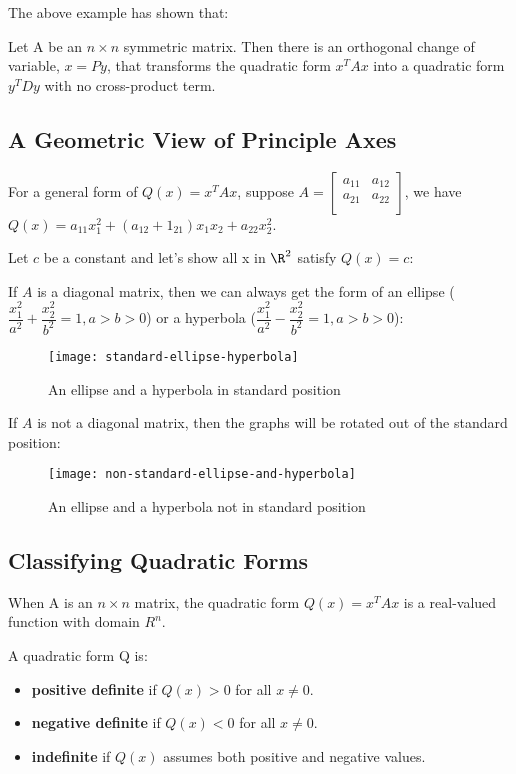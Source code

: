 The above example has shown that:
\begin{theorem}\label{theorem: Principle Axes Theorem}
    Let A be an \(n \times n\) symmetric matrix. Then there is an orthogonal change of variable, \(x = Py\), that transforms the quadratic form \(x^TAx\) into a quadratic form \(y^TDy\) with no cross-product term.    
\end{theorem}

\subsection{A Geometric View of Principle Axes}
For a general form of \(Q(x) = x^TAx\), suppose \(A = \begin{bmatrix}
    a_{11} &  a_{12} \\
    a_{21} &  a_{22} \\
\end{bmatrix}\), we have \(Q(x) = a_{11} x_1^2 + (a_{12}+1_{21})x_1x_2 + a_{22}x_2^2\).  

Let \(c\) be a constant and let's show all x in \(\R^2\) satisfy \(Q(x) = c\):  

If \(A\) is a diagonal matrix, then we can always get the form of an ellipse (\(\dfrac{x_1^2}{a^2} + \dfrac{x_2^2}{b^2} = 1, a > b > 0\)) or a hyperbola (\(\dfrac{x_1^2}{a^2} - \dfrac{x_2^2}{b^2} = 1, a > b > 0\)):
\begin{figure}[h]
    \centering
    \texttt{[image: standard-ellipse-hyperbola]}
    \caption{An ellipse and a hyperbola in standard position}
    \label{fig:standard-ellipse-hyperbola}
\end{figure}

If \(A\)  is not a diagonal matrix, then the graphs will be rotated out of the standard position:
\begin{figure}[h]
    \centering
    \texttt{[image: non-standard-ellipse-and-hyperbola]}
    \caption{An ellipse and a hyperbola not in standard position}
    \label{fig:non-standard-ellipse-and-hyperbola}
\end{figure}

\subsection{Classifying Quadratic Forms}
When A is an \(n \times n\) matrix, the quadratic form \(Q(x) = x^T Ax\) is a real-valued function with domain \(R^n\).   

\begin{definition}
    A quadratic form Q is:
    \begin{itemize}
        \item \textbf{positive definite} if \(Q(x) > 0\) for all \(x \ne 0\). 
        \item \textbf{negative definite} if \(Q(x) < 0\) for all \(x \ne 0\). 
        \item \textbf{indefinite}  if \(Q(x)\) assumes both positive and negative values.  
    \end{itemize}
\end{definition}

